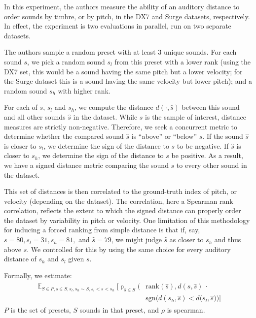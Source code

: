 In this experiment, the authors measure the ability of an auditory distance to order sounds by timbre, or by pitch, in the DX7 and Surge datasets, respectively. In effect, the experiment is two evaluations in parallel, run on two separate datasets.

The authors sample a random preset with at least 3 unique sounds. For each sound $s$, we pick a random sound $s_l$ from this preset with a lower rank (using the DX7 set, this would be a sound having the same pitch but a lower velocity; for the Surge dataset this is a sound having the same velocity but lower pitch); and a random sound $s_h$ with higher rank. %

For each of $s$, $s_l$ and $s_h$, we compute the distance $d(\cdot, \hat{s})$ between this sound and all other sounds $\hat{s}$ in the dataset. While $s$ is the sample of interest, distance measures are strictly non-negative. Therefore, we seek a concurrent metric to determine whether the compared sound $\hat{s}$ is ``above'' or ``below'' $s$. If the sound $\hat{s}$ is closer to $s_l$, we determine the sign of the distance to $s$ to be negative. If $\hat{s}$ is closer to $s_h$, we determine the sign of the distance to $s$ be positive. As a result, we have a signed distance metric comparing the sound $s$ to every other sound in the dataset.

This set of distances is then correlated to the ground-truth index of pitch, or velocity (depending on the dataset). The correlation, here a Spearman rank correlation, reflects the extent to which the signed distance can properly order the dataset by variability in pitch or velocity. 
One limitation of this methodology for inducing a forced ranking from simple distance is that if, say, $s = 80, s_l = 31, s_h = 81,$ and $\hat{s} = 79$, we might judge $\hat{s}$ as closer to $s_h$ and thus above $s$. We controlled for this by using the same choice for every auditory distance of $s_h$ and $s_l$ given $s$.

Formally, we estimate:
\begin{align}
\begin{split}
\mathop{\mathbb{E}}_{S \in P, s \in S, s_l, s_h \sim S, s_l < s < s_h} \bigg [ \mathop{\rho}_{\hat{s} \in S}\Big (& \textrm{rank}(\hat{s}), d(s, \hat{s}) \ \cdot \\
& \textrm{sgn} \big (d(s_h, \hat{s}) < d(s_l, \hat{s} \big ) \Big) \bigg ]
\end{split}
\end{align}
$P$ is the set of presets, $S$ sounds in that preset, and $\rho$ is spearman.

